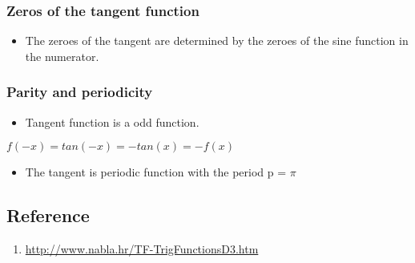 \documentclass{article}
\begin{document}
\subsubsection{Zeros of the tangent function}
\begin{itemize}
    \item The zeroes of the tangent are determined by the zeroes of the sine function in the numerator.
\end{itemize}
\subsubsection{ Parity and periodicity}
\begin{itemize}
    \item Tangent function is a odd function.
\end{itemize}
\begin{center}
    $ f(-x) = tan(-x)=-tan(x)=-f(x)$
\end{center}\hfill
   \begin{itemize}
    \item The tangent is periodic function with the period  p = $\pi$
\end{itemize}
\subsection{Reference}
\begin{enumerate}
    \item  \url{http://www.nabla.hr/TF-TrigFunctionsD3.htm}
\end{enumerate}
\end{document}
